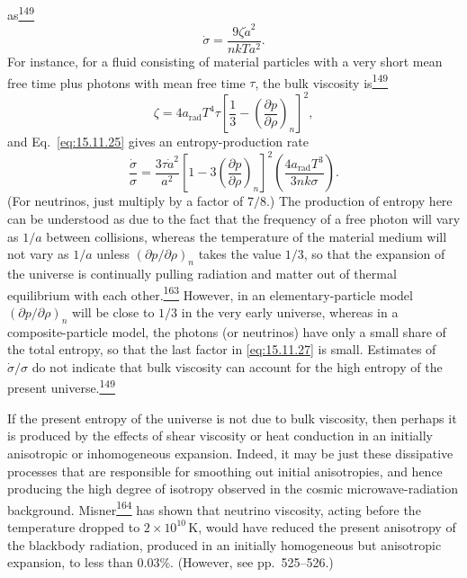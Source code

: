 as\hyperref[ch15-ref-149]{\textsuperscript{149}}
\begin{equation}
  \dot\sigma
  =
  \frac{9\zeta\dot a^2}{nkTa^2}.
  \tag{15.11.25}\label{eq:15.11.25}
\end{equation}
For instance, for a fluid consisting of material particles with a very short
mean free time plus photons with mean free time \(\tau\), the bulk viscosity
is\hyperref[ch15-ref-149]{\textsuperscript{149}}
\begin{equation}
  \zeta
  =
  4a_{\mathrm{rad}}T^4\tau
  \left[
    \frac13-\left(\frac{\partial p}{\partial\rho}\right)_n
  \right]^2,
  \tag{15.11.26}\label{eq:15.11.26}
\end{equation}
and Eq.~\eqref{eq:15.11.25} gives an entropy-production rate
\begin{equation}
  \frac{\dot\sigma}{\sigma}
  =
  \frac{3\tau\dot a^2}{a^2}
  \left[
    1-3\left(\frac{\partial p}{\partial\rho}\right)_n
  \right]^2
  \left(
    \frac{4a_{\mathrm{rad}}T^3}{3nk\sigma}
  \right).
  \tag{15.11.27}\label{eq:15.11.27}
\end{equation}
(For neutrinos, just multiply by a factor of \(7/8\).) The production of
entropy here can be understood as due to the fact that the frequency of a free
photon will vary as \(1/a\) between collisions, whereas the temperature of
the material medium will not vary as \(1/a\) unless
\((\partial p/\partial\rho)_n\) takes the value \(1/3\), so that the
expansion of the universe is continually pulling radiation and matter out of
thermal equilibrium with each
other.\hyperref[ch15-ref-163]{\textsuperscript{163}} However, in an
elementary-particle model \((\partial p/\partial\rho)_n\) will be close to
\(1/3\) in the very early universe, whereas in a composite-particle model,
the photons (or neutrinos) have only a small share of the total entropy, so
that the last factor in \eqref{eq:15.11.27} is small. Estimates of
\(\dot\sigma/\sigma\) do not indicate that bulk viscosity can account for
the high entropy of the present
universe.\hyperref[ch15-ref-149]{\textsuperscript{149}}

If the present entropy of the universe is not due to bulk viscosity, then
perhaps it is produced by the effects of shear viscosity or heat conduction in
an initially anisotropic or inhomogeneous expansion. Indeed, it may be just
these dissipative processes that are responsible for smoothing out initial
anisotropies, and hence producing the high degree of isotropy observed in the
cosmic microwave-radiation background.
Misner\hyperref[ch15-ref-164]{\textsuperscript{164}} has shown that neutrino
viscosity, acting before the temperature dropped to
\(2\times10^{10}\,\mathrm K\), would have reduced the present anisotropy of
the blackbody radiation, produced in an initially homogeneous but anisotropic
expansion, to less than \(0.03\%\). (However, see pp.~525--526.)

